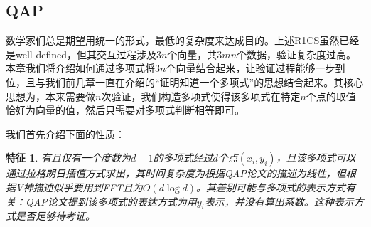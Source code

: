 \documentclass[12pt]{article}
\newtheorem{property}{特征}
\begin{document}
\subsection{QAP}
\label{sec:QAP}
数学家们总是期望用统一的形式，最低的复杂度来达成目的。上述R1CS虽然已经是well defined，但其交互过程涉及$3n$个向量，共$3mn$个数据，验证复杂度过高。本章我们将介绍如何通过多项式将$3n$个向量结合起来，让验证过程能够一步到位，且与我们前几章一直在介绍的“证明知道一个多项式”的思想结合起来。其核心思想为，本来需要做$n$次验证，我们构造多项式使得该多项式在特定$n$个点的取值恰好为向量的值，然后只需要对多项式判断相等即可。

我们首先介绍下面的性质：
\begin{property}
	有且仅有一个度数为$d-1$的多项式经过$d$个点$(x_i,y_i)$，且该多项式可以通过拉格朗日插值方式求出，其时间复杂度为{\color{red}根据QAP论文的描述为线性，但根据V神描述似乎要用到FFT且为$O(d\log d)$。其差别可能与多项式的表示方式有关：QAP论文提到该多项式的表达方式为用$y_i$表示，并没有算出系数。这种表示方式是否足够待考证。}
\end{property}
\end{document}
